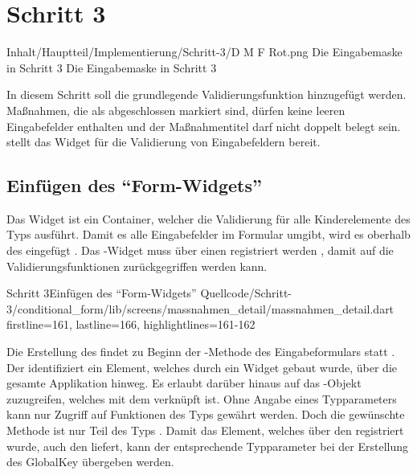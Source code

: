 \chapter{Schritt 3}
\label{chap:Schritt-3}



  
  \begin{alexfigure}{Inhalt/Hauptteil/Implementierung/Schritt-3/D M F Rot.png}
    {Die Eingabemaske in Schritt 3}
    {Die Eingabemaske in Schritt 3}
  
    \label{fig:Schritt3Eingabemaske}
  
  \end{alexfigure}

In diesem Schritt soll die grundlegende Validierungsfunktion hinzugefügt werden.
Maßnahmen, die als abgeschlossen markiert sind, dürfen keine leeren Eingabefelder enthalten und der Maßnahmentitel darf nicht doppelt belegt sein.
 stellt das Widget  für die Validierung von Eingabefeldern bereit.

\section{Einfügen des \enquote{Form-Widgets}}

Das Widget  ist ein Container, welcher die Validierung für alle Kinderelemente des Typs  ausführt.
Damit es alle Eingabefelder im Formular umgibt, wird es oberhalb des  eingefügt .
Das -Widget muss über einen  registriert werden , damit auf die Validierungsfunktionen zurückgegriffen werden kann.

\begin{alexlisting}{Schritt 3}{Einfügen des \enquote{Form-Widgets}}
    {Quellcode/Schritt-3/conditional_form/lib/screens/massnahmen_detail/massnahmen_detail.dart}
    {firstline=161, lastline=166, highlightlines={161-162}}
    \label{lst:Schritt3Form}
\end{alexlisting}
  
Die Erstellung des  findet zu Beginn der -Methode des Eingabeformulars statt .
Der  identifiziert ein Element, welches durch ein Widget gebaut wurde, über die gesamte Applikation hinweg.
Es erlaubt darüber hinaus auf das -Objekt zuzugreifen, welches mit dem  verknüpft ist.
Ohne Angabe eines Typparameters kann nur Zugriff auf Funktionen des Typs  gewährt werden.
Doch die gewünschte Methode  ist nur Teil des Typs .
Damit das Element, welches über den  registriert wurde, auch den  liefert, kann der entsprechende Typparameter  bei der Erstellung des GlobalKey übergeben werden.

